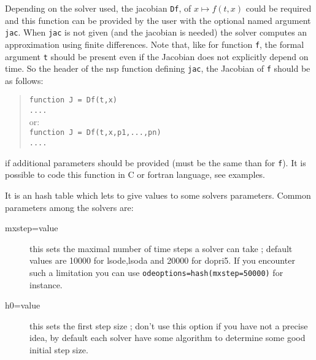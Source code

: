 \begin{mandescription}
 Depending on the solver used, the jacobian 
\verb+Df+, of $x \mapsto f(t,x)$ could be required and this function can be 
provided by the user with the optional named argument \verb+jac+. When 
\verb+jac+ is not given (and the jacobian is needed) the solver computes an 
approximation using finite differences. Note that, like for function \verb+f+, 
the formal argument \verb+t+ should be present even if
the Jacobian does not explicitly depend on time. So the header of
the nsp function defining \verb+jac+, the Jacobian of \verb+f+ should be as follows:
\begin{quote}
{\tt function J = Df(t,x) \\
      ....}\\
or:\\
{\tt function J = Df(t,x,p1,...,pn) \\
     ....}
\end{quote}
if additional parameters should be provided (must be the same than for \verb+f+).
It is possible to code this function in C or fortran language, see examples. 

 It is an hash table which lets to give values to some solvers parameters. 
Common parameters among the solvers are:
\begin{description}
\item[mxstep=value] this sets the maximal number of time steps a solver can take ; default
values are 10000 for lsode,lsoda and 20000 for dopri5. If you encounter such a limitation
you can use \verb+odeoptions=hash(mxstep=50000)+ for instance.
\item[h0=value] this sets the first step size ; don't use this option if you have not a precise
idea, by default each solver have some algorithm to determine some good initial step size.
\end{description}



\end{mandescription}
